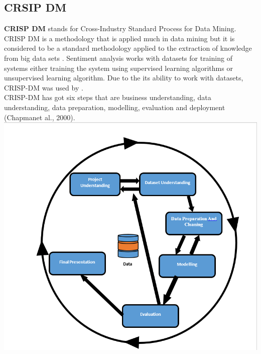 \documentclass[12pt]{report}
\begin{document}
	\subsection{CRSIP DM}
	\textbf{	CRISP DM }stands for Cross-Industry Standard Process for Data Mining. CRISP DM is a methodology that is applied much in data mining but it is considered to be a standard methodology applied to the extraction of knowledge from big data sets \citep{sharda2016business}. Sentiment analysis works with datasets for training of systems either training the system using supervised learning algorithms or unsupervised learning algorithm. Due to the its ability to work with datasets, CRISP-DM was used by \cite{nave2018decision}.\\
	
	CRISP-DM has got six steps that are business understanding, data understanding, data preparation, modelling, evaluation and deployment (Chapmanet al., 2000).\\
	
	\includegraphics[scale=0.5]{crisp.png}
	
\end{document}
